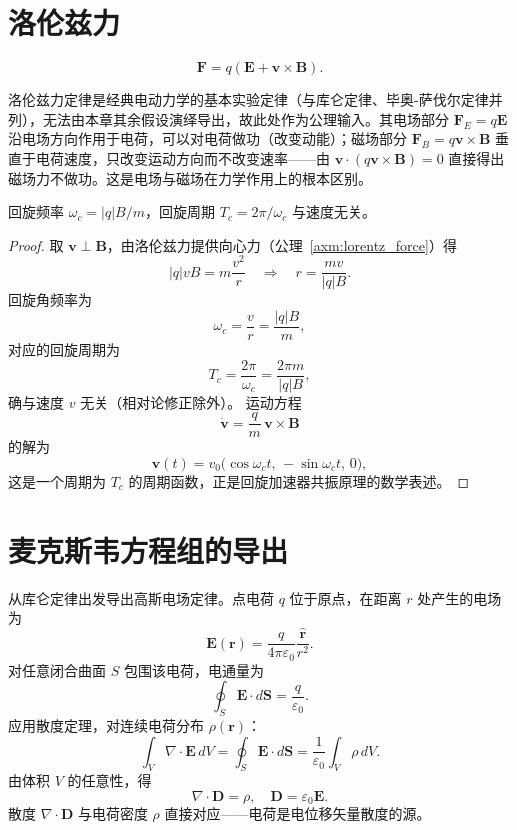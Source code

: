 \section{洛伦兹力}

\begin{axiom}[洛伦兹力定律]\label{axm:lorentz_force}
\[
\boxed{\mathbf{F} = q(\mathbf{E} + \mathbf{v} \times \mathbf{B})}.
\]
\end{axiom}

\begin{remark}[实验定律的地位与两种力的性质]
洛伦兹力定律是经典电动力学的基本实验定律（与库仑定律、毕奥-萨伐尔定律并列），无法由本章其余假设演绎导出，故此处作为公理输入。其电场部分 $\mathbf{F}_E = q\mathbf{E}$ 沿电场方向作用于电荷，可以对电荷做功（改变动能）；磁场部分 $\mathbf{F}_B = q\mathbf{v}\times\mathbf{B}$ 垂直于电荷速度，只改变运动方向而不改变速率——由 $\mathbf{v}\cdot(q\mathbf{v}\times\mathbf{B}) = 0$ 直接得出磁场力不做功。这是电场与磁场在力学作用上的根本区别。
\end{remark}

\begin{proposition}[均匀磁场中电荷的圆周运动]\label{prop:cyclotron_motion}
回旋频率 $\omega_c = |q|B/m$，回旋周期 $T_c = 2\pi/\omega_c$ 与速度无关。
\end{proposition}

\begin{proof}
取 $\mathbf{v}\perp\mathbf{B}$，由洛伦兹力提供向心力（公理~\ref{axm:lorentz_force}）得
\[
|q|vB = m\frac{v^2}{r}
\quad\Longrightarrow\quad
r = \frac{mv}{|q|B}.
\]
回旋角频率为
\[
\omega_c = \frac{v}{r} = \frac{|q|B}{m},
\]
对应的回旋周期为
\[
T_c = \frac{2\pi}{\omega_c} = \frac{2\pi m}{|q|B},
\]
确与速度 $v$ 无关（相对论修正除外）。
运动方程
\[
\dot{\mathbf{v}} = \frac{q}{m}\,\mathbf{v}\times\mathbf{B}
\]
的解为
\[
\mathbf{v}(t)
= v_0\bigl(\cos\omega_c t,\, -\sin\omega_c t,\, 0\bigr),
\]
这是一个周期为 $T_c$ 的周期函数，正是回旋加速器共振原理的数学表述。
\end{proof}

\section{麦克斯韦方程组的导出}

\begin{theorem}[高斯电场定律的导出]\label{thm:gauss_electric_derivation}
从库仑定律出发导出高斯电场定律。点电荷 $q$ 位于原点，在距离 $r$ 处产生的电场为
\[
\mathbf{E}(\mathbf{r}) = \frac{q}{4\pi\varepsilon_0} \frac{\hat{\mathbf{r}}}{r^2}.
\]
对任意闭合曲面 $S$ 包围该电荷，电通量为
\[
\oint_S \mathbf{E} \cdot d\mathbf{S} = \frac{q}{\varepsilon_0}.
\]
应用散度定理，对连续电荷分布 $\rho(\mathbf{r})$：
\[
\int_V \nabla \cdot \mathbf{E} \, dV = \oint_S \mathbf{E} \cdot d\mathbf{S} = \frac{1}{\varepsilon_0} \int_V \rho \, dV.
\]
由体积 $V$ 的任意性，得
\[
\boxed{\nabla \cdot \mathbf{D} = \rho}, \quad \mathbf{D} = \varepsilon_0 \mathbf{E}.
\]
散度 $\nabla\cdot\mathbf{D}$ 与电荷密度 $\rho$ 直接对应——电荷是电位移矢量散度的源。
\end{theorem}


